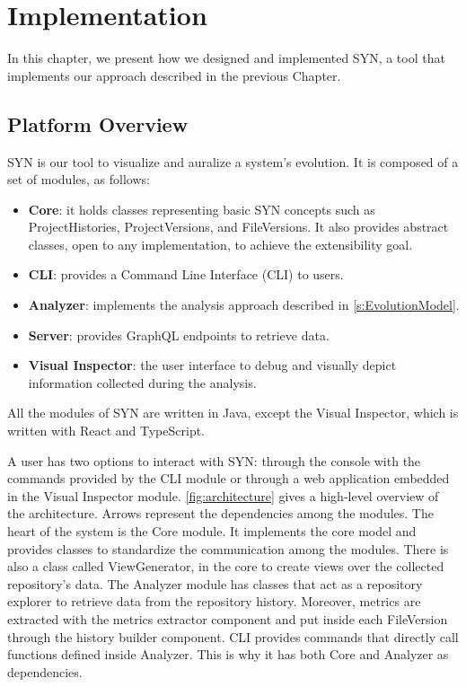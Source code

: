 \chapter[Implementation]{Implementation}
\graphicspath{ {images/implementation} }
In this chapter, we present how we designed and implemented SYN, a tool that implements our approach described in the previous Chapter.

\section{Platform Overview}
SYN is our tool to visualize and auralize a system's evolution. 
It is composed of a set of modules, as follows:
\begin{itemize}
    \item \textbf{Core}: it holds classes representing basic SYN concepts such as ProjectHistories, ProjectVersions, and FileVersions. It also provides abstract classes, open to any implementation, to achieve the extensibility goal.
    \item \textbf{CLI}: provides a Command Line Interface (CLI) to users.
    \item \textbf{Analyzer}: implements the analysis approach described in \autoref{s:EvolutionModel}. 
    \item \textbf{Server}: provides GraphQL endpoints to retrieve data. 
    \item \textbf{Visual Inspector}: the user interface to debug and visually depict information collected during the analysis. 
\end{itemize}

All the modules of SYN are written in Java, except the Visual Inspector, which is written with React and TypeScript. 

A user has two options to interact with SYN: through the console with the commands provided by the CLI module 
or through a web application embedded in the Visual Inspector module.
\autoref{fig:architecture} gives a high-level overview of the architecture. Arrows represent the dependencies among the modules.
The heart of the system is the Core module. It implements the core model and provides classes to standardize the communication among the modules.
There is also a class called ViewGenerator, in the core to create views over the collected repository's data.
The Analyzer module has classes that act as a repository explorer to retrieve data from the repository history. 
Moreover, metrics are extracted with the metrics extractor component and put inside each FileVersion through the history builder component. 
CLI provides commands that directly call functions defined inside Analyzer. 
This is why it has both Core and Analyzer as dependencies. 

